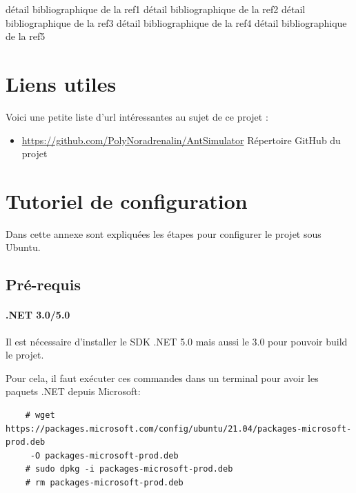 \documentclass{EPUProjetDi}
\begin{document}
\begin{thebibliography}{99}
\label{sec:biblio}
  détail bibliographique de la ref1
  détail bibliographique de la ref2
  détail bibliographique de la ref3
  détail bibliographique de la ref4
  détail bibliographique de la ref5
\end{thebibliography}


\appendix
{}


\chapter{Liens utiles}
Voici une petite liste d'url intéressantes au sujet de ce projet :

\begin{itemize}
\item {\url{https://github.com/PolyNoradrenalin/AntSimulator} Répertoire GitHub du projet}
\end{itemize}


\chapter{Tutoriel de configuration}
Dans cette annexe sont expliquées les étapes pour configurer le projet sous Ubuntu.

\section*{Pré-requis}
\subsubsection*{.NET 3.0/5.0}
Il est nécessaire d'installer le SDK .NET 5.0 mais aussi le 3.0 pour pouvoir build le projet.

\small
Pour cela, il faut exécuter ces commandes dans un terminal pour avoir les paquets .NET depuis Microsoft:
\begin{verbatim}
    # wget https://packages.microsoft.com/config/ubuntu/21.04/packages-microsoft-prod.deb 
     -O packages-microsoft-prod.deb
    # sudo dpkg -i packages-microsoft-prod.deb
    # rm packages-microsoft-prod.deb
\end{verbatim}
\normalsize
\end{document}

